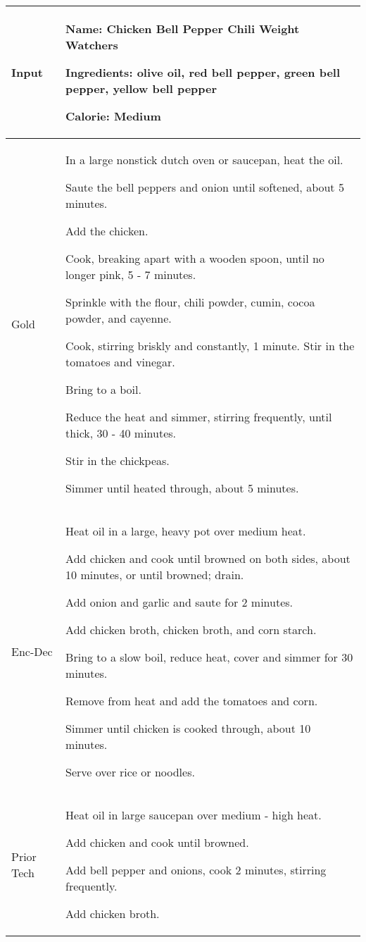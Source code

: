 \documentclass[11pt,a4paper]{article}
\begin{document}
\begin{table*}[h!]
\small
\centering
\begin{tabularx}{\linewidth}{ l X }
\toprule
Input                   & \textbf{Name:} Chicken Bell Pepper Chili Weight Watchers

\textbf{Ingredients:} olive oil, red bell pepper, green bell pepper, yellow bell pepper

\textbf{Calorie:} Medium \\ \midrule
Gold                    & In a large nonstick dutch oven or saucepan, heat the oil.

Saute the bell peppers and onion until softened, about 5 minutes.

Add the chicken.

Cook, breaking apart with a wooden spoon, until no longer pink, 5 - 7 minutes.

Sprinkle with the flour, chili powder, cumin, cocoa powder, and cayenne.

Cook, stirring briskly and constantly, 1 minute. Stir in the tomatoes and vinegar.

Bring to a boil.

Reduce the heat and simmer, stirring frequently, until thick, 30 - 40 minutes.

Stir in the chickpeas.

Simmer until heated through, about 5 minutes. \\ \midrule
Enc-Dec                 & Heat oil in a large, heavy pot over medium heat.

Add chicken and cook until browned on both sides, about 10 minutes, or until browned; drain.

Add onion and garlic and saute for 2 minutes.

Add chicken broth, chicken broth, and corn starch.

Bring to a slow boil, reduce heat, cover and simmer for 30 minutes.

Remove from heat and add the tomatoes and corn.

Simmer until chicken is cooked through, about 10 minutes.

Serve over rice or noodles.   \\ \midrule
Prior Tech        & Heat oil in large saucepan over medium - high heat.

Add chicken and cook until browned.

Add bell pepper and onions, cook 2 minutes, stirring frequently.

Add chicken broth.


\end{tabularx}
\end{table*}
\end{document}
